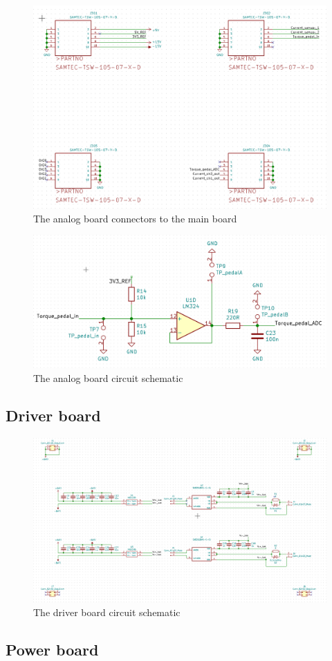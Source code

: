 \begin{figure} [H]
  \centering
  \includegraphics[width=\linewidth]{pictures/hardware/Analog_Interface_board/analog_connectors.png}
  \caption{The analog board connectors to the main board}
  \label{fig:analog_connector}
\end{figure}

\begin{figure} [H]
  \centering
  \includegraphics[width=\linewidth]{pictures/hardware/Analog_Interface_board/torque_pedal_divider.png}
  \caption{The analog board circuit schematic}
  \label{fig:analog_torque_pedal}
\end{figure}

\subsection{Driver board}

\begin{figure} [H]
  \centering
  \includegraphics[width=\linewidth, angle = 90]{pictures/hardware/Driver_Board/driver_schematic.png}
  \caption{The driver board circuit schematic}
  \label{fig:driver_schematic}
\end{figure}

\subsection{Power board}